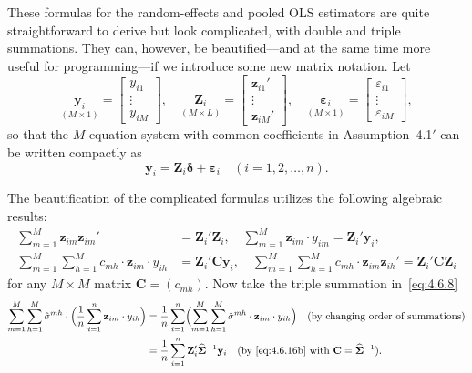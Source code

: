 These formulas for the random-effects and pooled OLS estimators are quite straightforward
to derive but look complicated, with double and triple summations. They
can, however, be beautified---and at the same time more useful for programming---if
we introduce some new matrix notation. Let
\begin{equation}
\underset{(M \times 1)}{\mathbf{y}_i}
= \begin{bmatrix} y_{i1} \\ \vdots \\ y_{iM} \end{bmatrix}, \quad
\underset{(M \times L)}{\mathbf{Z}_i}
= \begin{bmatrix} \mathbf{z}_{i1}' \\ \vdots \\ \mathbf{z}_{iM}' \end{bmatrix}, \quad
\underset{(M \times 1)}{\boldsymbol{\varepsilon}_i}
= \begin{bmatrix} \varepsilon_{i1} \\ \vdots \\ \varepsilon_{iM} \end{bmatrix},
\label{eq:4.6.15}
\end{equation}
so that the $M$-equation system with common coefficients in Assumption~4.1$'$ can
be written compactly as
\begin{equation}
\mathbf{y}_i = \mathbf{Z}_i \boldsymbol{\delta} + \boldsymbol{\varepsilon}_i
\quad (i = 1, 2, \ldots, n).
\tag{4.6.1$'$}
\label{eq:4.6.1p}
\end{equation}

The beautification of the complicated formulas utilizes the following algebraic
results:
\begin{align}
\sum_{m=1}^{M} \mathbf{z}_{im} \mathbf{z}_{im}' &= \mathbf{Z}_i' \mathbf{Z}_i, \quad
\sum_{m=1}^{M} \mathbf{z}_{im} \cdot y_{im} = \mathbf{Z}_i' \mathbf{y}_i,
\label{eq:4.6.16a} \\
\sum_{m=1}^{M} \sum_{h=1}^{M} c_{mh} \cdot \mathbf{z}_{im} \cdot y_{ih}
&= \mathbf{Z}_i' \mathbf{C} \mathbf{y}_i, \quad
\sum_{m=1}^{M} \sum_{h=1}^{M} c_{mh} \cdot \mathbf{z}_{im} \mathbf{z}_{ih}'
= \mathbf{Z}_i' \mathbf{C} \mathbf{Z}_i
\label{eq:4.6.16b}
\end{align}
for any $M \times M$ matrix $\mathbf{C} = (c_{mh})$.
Now take the triple summation in~\eqref{eq:4.6.8}
\begin{align}
\sum_{m=1}^{M} \sum_{h=1}^{M} \hat{\sigma}^{mh} \cdot
\Bigl(\frac{1}{n} \sum_{i=1}^{n} \mathbf{z}_{im} \cdot y_{ih}\Bigr)
&= \frac{1}{n} \sum_{i=1}^{n}
\Bigl(\sum_{m=1}^{M} \sum_{h=1}^{M} \hat{\sigma}^{mh} \cdot
\mathbf{z}_{im} \cdot y_{ih}\Bigr)
\quad \text{(by changing order of summations)} \notag \\
&= \frac{1}{n} \sum_{i=1}^{n} \mathbf{Z}_i'
\widehat{\boldsymbol{\Sigma}}^{-1} \mathbf{y}_i
\quad \text{(by~\eqref{eq:4.6.16b} with
$\mathbf{C} = \widehat{\boldsymbol{\Sigma}}^{-1}$).}
\label{eq:4.6.17}
\end{align}

